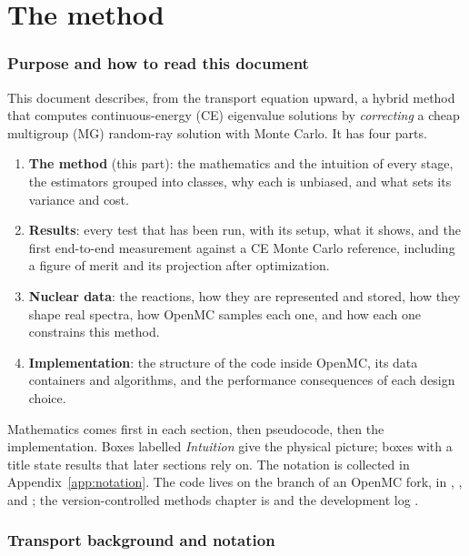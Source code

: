 \part{The method}\label{part:method}

\section{Purpose and how to read this document}

This document describes, from the transport equation upward, a hybrid method that computes
continuous-energy (CE) eigenvalue solutions by \emph{correcting} a cheap multigroup (MG) random-ray
solution with Monte Carlo. It has four parts.

\begin{enumerate}
\item \textbf{The method} (this part): the mathematics and the intuition of every stage, the
  estimators grouped into classes, why each is unbiased, and what sets its variance and cost.
\item \textbf{Results}: every test that has been run, with its setup, what it shows, and the first
  end-to-end measurement against a CE Monte Carlo reference, including a figure of merit and its
  projection after optimization.
\item \textbf{Nuclear data}: the reactions, how they are represented and stored, how they shape
  real spectra, how OpenMC samples each one, and how each one constrains this method.
\item \textbf{Implementation}: the structure of the code inside OpenMC, its data containers and
  algorithms, and the performance consequences of each design choice.
\end{enumerate}

Mathematics comes first in each section, then pseudocode, then the implementation. Boxes labelled
\emph{Intuition} give the physical picture; boxes with a title state results that later sections
rely on. The notation is collected in Appendix~\ref{app:notation}. The code lives on the
 branch of an OpenMC fork, in , ,
 and ; the version-controlled methods chapter is
 and the development log .

\section{Transport background and notation}\label{sec:background}

